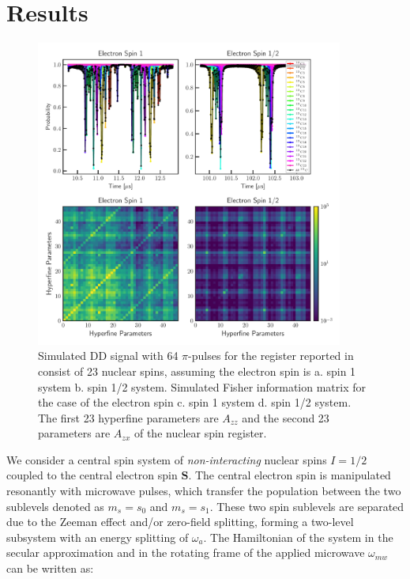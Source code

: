 \documentclass[%
 reprint,
superscriptaddress,
 amsmath,amssymb,
 aps,
]{revtex4-2}
\begin{document}
\section{Results}
\label{sec:theory}
\begin{figure}%
	\begin{center}
		\includegraphics[width=0.9\textwidth]{pict/dd_compare2.pdf}
		\caption{Simulated DD signal with 64 $\pi$-pulses for the register reported in  \cite{abobeih2019atomic} consist of 23 nuclear spins, assuming the electron spin is a. spin 1 system b. spin 1/2 system. Simulated Fisher information matrix for the case of the electron spin c. spin 1 system d. spin 1/2 system. The first 23 hyperfine parameters are $A_{zz}$ and the second 23 parameters are $A_{zx}$ of the nuclear spin register.}
		\label{fig:3}
	\end{center}
\end{figure}
We consider a central spin system of \textit{non-interacting} nuclear spins $I=1/2$ coupled to the central electron spin $\boldsymbol{S}$.
The central electron spin is manipulated resonantly with microwave pulses, which transfer the population between the two sublevels denoted as $m_s=s_0$ and $m_s = s_1$.
These two spin sublevels are separated due to the Zeeman effect and/or zero-field splitting, forming a two-level subsystem with an energy splitting of $\omega_a$.
The Hamiltonian of the system in the secular approximation and in the rotating frame of the applied microwave $\omega_{mw}$ can be written as:
\end{document}
